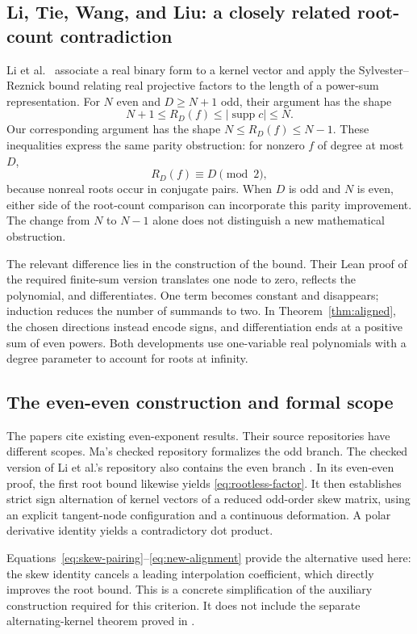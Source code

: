 \documentclass[11pt,a4paper]{article}
\numberwithin{equation}{section}
\theoremstyle{remark}
\newcommand{\supp}{\operatorname{supp}}
\begin{document}
\subsection{Li, Tie, Wang, and Liu: a closely related root-count contradiction}

Li et al.\ \cite{Li} associate a real binary form to a kernel vector and
apply the Sylvester--Reznick bound relating real projective factors to the
length of a power-sum representation. For $N$ even and $D\ge N+1$ odd,
their argument has the shape
\[
 N+1\le R_D(f)\le |\supp c|\le N.
\]
Our corresponding argument has the shape $N\le R_D(f)\le N-1$. These
inequalities express the same parity obstruction: for nonzero $f$ of degree
at most $D$,
\[
 R_D(f)\equiv D\pmod2,
\]
because nonreal roots occur in conjugate pairs. When $D$ is odd and $N$ is
even, either side of the root-count comparison can incorporate this parity
improvement. The change from $N$ to $N-1$ alone does not distinguish a new
mathematical obstruction.

The relevant difference lies in the construction of the bound. Their Lean
proof of the required finite-sum version \cite{LiCode} translates one node
to zero, reflects the polynomial, and differentiates. One term becomes
constant and disappears; induction reduces the number of summands to two.
In Theorem~\ref{thm:aligned}, the chosen directions instead encode signs,
and differentiation ends at a positive sum of even powers. Both developments
use one-variable real polynomials with a degree parameter to account for
roots at infinity.

\subsection{The even-even construction and formal scope}

The papers \cite{Ma,Li} cite existing even-exponent results. Their source
repositories have different scopes. Ma's checked repository formalizes the
odd branch. The checked version of Li et al.'s repository also contains
the even branch \cite{LiCode}. In its even-even proof, the first root bound
likewise yields \eqref{eq:rootless-factor}. It then establishes strict sign
alternation of kernel vectors of a reduced odd-order skew matrix, using an
explicit tangent-node configuration and a continuous deformation. A polar
derivative identity yields a contradictory dot product.

Equations~\eqref{eq:skew-pairing}--\eqref{eq:new-alignment} provide the
alternative used here: the skew identity cancels a leading interpolation
coefficient, which directly improves the root bound. This is a concrete
simplification of the auxiliary construction required for this criterion.
It does not include the separate alternating-kernel theorem proved in
\cite{LiCode}.
\end{document}
